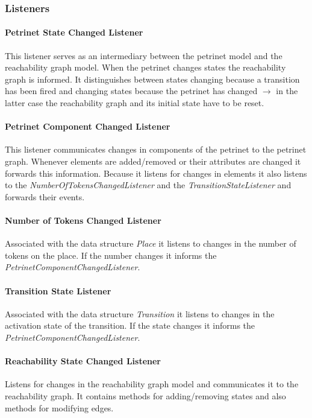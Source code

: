 \documentclass[10pt, a4paper]{article}
\begin{document}
\subsubsection{Listeners}

\paragraph{Petrinet State Changed Listener} This listener serves as an intermediary between the petrinet model and the reachability graph model. When the petrinet changes states the reachability graph is informed. It distinguishes between states changing because a transition has been fired and changing states because the petrinet has changed $\rightarrow$ in the latter case the reachability graph and its initial state have to be reset.

\paragraph{Petrinet Component Changed Listener} This listener communicates changes in components of the petrinet to the petrinet graph. Whenever elements are added/removed or their attributes are changed it forwards this information.  Because it listens for changes in elements it also listens to the \textit{NumberOfTokensChangedListener} and the \textit{TransitionStateListener} and forwards their events.

\paragraph{Number of Tokens Changed Listener} Associated with the data structure \textit{Place} it listens to changes in the number of tokens on the place. If the number changes it informs the \textit{PetrinetComponentChangedListener}. 

\paragraph{Transition State Listener} Associated with the data structure \textit{Transition} it listens to changes in the activation state of the transition. If the state changes it informs the \textit{PetrinetComponentChangedListener}.

\paragraph{Reachability State Changed Listener} Listens for changes in the reachability graph model and communicates it to the reachability graph. It contains methods for adding/removing states and also methods for modifying edges.
\end{document}

